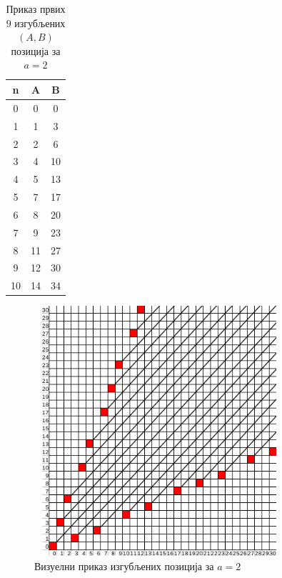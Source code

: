 \documentclass[a4paper]{article}
\begin{document}
\begin{table}[h!]
	\caption{Приказ првих $ 9 $ изгубљених $ (A, B) $ позиција за $ a = 2 $}
	\label{tab:a_2_Ppozicije}
	\begin{center}
		\begin{tabular}{  c | c | c }
			{\textbf{n}} &  {\textbf{A}} &  {\textbf{B}} \\
			\hline
			0 & 0 & 0 \\
			1 & 1 & 3 \\
			2 & 2 & 6 \\
			3 & 4 & 10 \\
			4 & 5 & 13 \\
			5 & 7 & 17 \\
			6 & 8 & 20 \\
			7 & 9 & 23 \\
			8 & 11 & 27 \\
			9 & 12 & 30 \\
			10 & 14 & 34\\ 
		\end{tabular}
	\end{center}
\end{table}

\begin{figure}[H]
	\begin{center}
		\includegraphics[width=350px, height=350px]{p_positions_a=2.png}
	\end{center}
	\caption{Визуелни приказ изгубљених позиција за $ a = 2 $}
	\label{fig:p_positions_a=2}
\end{figure}
\end{document}
